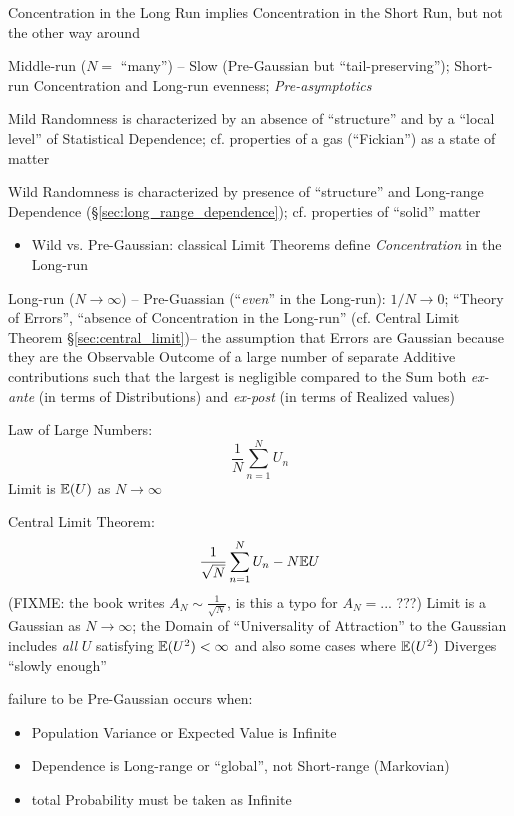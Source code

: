 Concentration in the Long Run implies Concentration in the Short Run, but not
the other way around

Middle-run ($N =$ ``many'') -- Slow (Pre-Gaussian but ``tail-preserving'');
Short-run Concentration and Long-run evenness; \emph{Pre-asymptotics}

Mild Randomness is characterized by an absence of ``structure'' and by a ``local
level'' of Statistical Dependence; cf. properties of a gas (``Fickian'') as a
state of matter

Wild Randomness is characterized by presence of ``structure'' and Long-range
Dependence (\S\ref{sec:long_range_dependence}); cf. properties of ``solid''
matter

\begin{itemize}
  \item Wild vs. Pre-Gaussian: classical Limit Theorems define
    \emph{Concentration} in the Long-run
\end{itemize}

Long-run ($N \to \infty$) -- Pre-Guassian (``\emph{even}'' in the Long-run):
$1 / N \to 0$; ``Theory of Errors'', ``absence of Concentration in the
Long-run'' (cf. Central Limit Theorem \S\ref{sec:central_limit})-- the
assumption that Errors are Gaussian because they are the Observable Outcome of a
large number of separate Additive contributions such that the largest is
negligible compared to the Sum both \emph{ex-ante} (in terms of Distributions)
and \emph{ex-post} (in terms of Realized values)

Law of Large Numbers:
\[
  \frac{1}{N} \sum_{n=1}^N U_n
\]
Limit is $\mathbb{E}(U)$ as $N \to \infty$

Central Limit Theorem:
\[
  \frac{1}{\sqrt{N}} \sum_{n=1}^N U_n - N \mathbb{E}{U}
\]
(FIXME: the book writes $A_N \sim \frac{1}{\sqrt{N}}$, is this a typo for
$A_N = ...$ ???)
Limit is a Gaussian as $N \to \infty$; the Domain of ``Universality of
Attraction'' to the Gaussian includes \emph{all} $U$ satisfying $\mathbb{E}(U^2) <
\infty$ and also some cases where $\mathbb{E}(U^2)$ Diverges ``slowly enough''

failure to be Pre-Gaussian occurs when:
\begin{itemize}
  \item Population Variance or Expected Value is Infinite
  \item Dependence is Long-range or ``global'', not Short-range (Markovian)
  \item total Probability must be taken as Infinite
\end{itemize}

